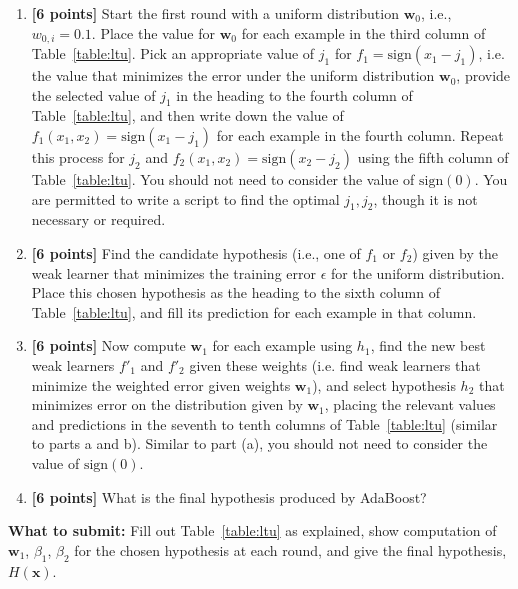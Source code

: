\documentclass[11pt]{article}
\begin{document}
  \begin{enumerate}
  \item {\bf [6 points]}  Start the first round with a uniform distribution $\textbf{w}_0$, i.e., $w_{0,i} = 0.1$.  Place the value for
    $\textbf{w}_0$ for each example in the third column of Table~\ref{table:ltu}.
Pick an appropriate value of $j_1$ for $f_1 = \text{sign}(x_1 - j_1)$, i.e. the value that minimizes the error under the uniform distribution $\textbf{w}_0$, provide the selected value of $j_1$ in the heading to the fourth column of Table~\ref{table:ltu}, and then write down the value of $f_1(x_1, x_2) = \text{sign}(x_1 - j_1)$ for each example in the fourth column. Repeat this process for $j_2$ and $f_2(x_1, x_2) = \text{sign}(x_2 - j_2)$ using the fifth column of Table~\ref{table:ltu}. You should not need to consider the value of $\text{sign}(0)$. You are permitted to write a script to find the optimal $j_1, j_2$, though it is not necessary or required.
\vspace{3cm}

  \item {\bf [6 points]}
    Find the candidate hypothesis (i.e., one of $f_1$ or $f_2$) given by the weak learner that minimizes the training error
    $\epsilon$ for the uniform distribution.  Place this chosen hypothesis as the heading to the
    sixth column of Table~\ref{table:ltu}, and fill its prediction for each example in that column.
    \vspace{3cm}

   \item {\bf [6 points]} Now compute $\textbf{w}_1$ for each example using $h_1$, find the new best weak learners $f'_1$ and $f'_2$ given these weights (i.e. find weak learners that minimize the weighted error given weights $\textbf{w}_1$), and select hypothesis $h_2$ that
    minimizes error on the distribution given by $\textbf{w}_1$, placing the relevant values and
    predictions in the seventh to tenth columns of Table~\ref{table:ltu} (similar to parts a and b). Similar to part (a), you should not need to consider the value of $\text{sign}(0)$.
    \vspace{3cm}

  \item {\bf [6 points]} What is the final hypothesis produced by AdaBoost?
  \vspace{3cm}

\end{enumerate}

\textbf{What to submit:} Fill out Table~\ref{table:ltu} as explained, show computation of  $\textbf{w}_1$, $\beta_1$, $\beta_2$ for the chosen hypothesis at each round, and give the final hypothesis, $H(\textbf{x})$.
\end{document}
